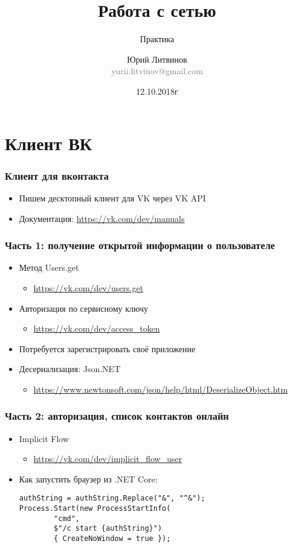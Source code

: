 \documentclass[xetex,mathserif,serif]{beamer}
\title{Работа с сетью}
\subtitle{Практика}
\author[Юрий Литвинов]{Юрий Литвинов\\\small{\textcolor{gray}{yurii.litvinov@gmail.com}}}
\date{12.10.2018г}
\begin{document}
	\frame{\titlepage}

	\section{Клиент ВК}

	\begin{frame}
		\frametitle{Клиент для вконтакта}
		\begin{itemize}
			\item Пишем десктопный клиент для VK через VK API
			\item Документация: \url{https://vk.com/dev/manuals}
		\end{itemize}
	\end{frame}

	\begin{frame}
		\frametitle{Часть 1: получение открытой информации о пользователе}
		\begin{itemize}
			\item Метод Users.get
			\begin{itemize}
				\item \url{https://vk.com/dev/users.get}
			\end{itemize}
			\item Авторизация по сервисному ключу
			\begin{itemize}
				\item \url{https://vk.com/dev/access_token}
			\end{itemize}
			\item Потребуется зарегистрировать своё приложение
			\item Десериализация: Json.NET
			\begin{itemize}
				\item \url{https://www.newtonsoft.com/json/help/html/DeserializeObject.htm}
			\end{itemize}
		\end{itemize}
	\end{frame}

	\begin{frame}[fragile]
		\frametitle{Часть 2: авторизация, список контактов онлайн}
		\begin{itemize}
			\item Implicit Flow
			\begin{itemize}
				\item \url{https://vk.com/dev/implicit_flow_user}
			\end{itemize}
			\item Как запустить браузер из .NET Core:
			\begin{verbatim}
authString = authString.Replace("&", "^&");
Process.Start(new ProcessStartInfo(
        "cmd", 
        $"/c start {authString}") 
        { CreateNoWindow = true });
			\end{verbatim}
		\end{itemize}
	\end{frame}
\end{document}
